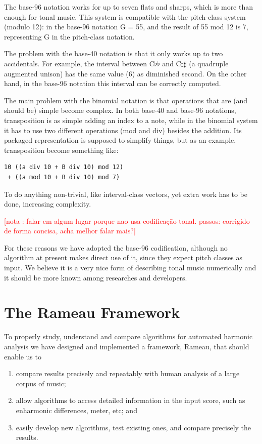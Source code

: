 \documentclass{article}
\newcounter{notacounter}
\newcommand{\nota}[1]{
  \addtocounter{notacounter}{1}
  \textcolor{red}{[nota \arabic{notacounter}: #1]}
}
\begin{document}
The base-96 notation works for up to seven flats and sharps, which is
more than enough for tonal music. This system is compatible with the
pitch-class system (modulo 12): in the base-96 notation G = 55, and
the result of 55 mod 12 is 7, representing G in the pitch-class
notation. 

The problem with the base-40 notation is that it only works up to two
accidentals. For example, the interval between C$\flat\flat$ and
C$\sharp\sharp$ (a quadruple augmented unison) has the same value (6)
as diminished second. On the other hand, in the base-96 notation this
interval can be correctly computed.

The main problem with the binomial notation is that operations that
are (and should be) simple become complex. In both base-40 and base-96
notations, transposition is as simple adding an index to a note, while
in the binomial system it has to use two different operations (mod and
div) besides the addition. Its packaged representation is supposed to
simplify things, but as an example, transposition become something
like:

\begin{verbatim}
10 ((a div 10 + B div 10) mod 12)
 + ((a mod 10 + B div 10) mod 7)
\end{verbatim}

To do anything non-trivial, like interval-class vectors, yet extra
work has to be done, increasing complexity.

\nota{falar em algum lugar porque nao usa codificação tonal. passos:
  corrigido de forma concisa, acha melhor falar mais?}

For these reasons we have adopted the base-96 codification, although
no algorithm at present makes direct use of it, since they expect
pitch classes as input. We believe it is a
very nice form of describing tonal music numerically and it should be
more known among researches and developers.

\section{The Rameau Framework}
\label{sec:system}

To properly study, understand and compare algorithms for automated
harmonic analysis we have designed and implemented a framework,
Rameau, that should enable us to

\begin{enumerate}
\item compare results precisely and repeatably with human analysis of
  a large corpus of music;
\item allow algorithms to access detailed information in the input score,
  such as enharmonic differences, meter, etc; and
\item easily develop new algorithms, test existing ones, and compare
  precisely the results.
\end{enumerate}
\end{document}
